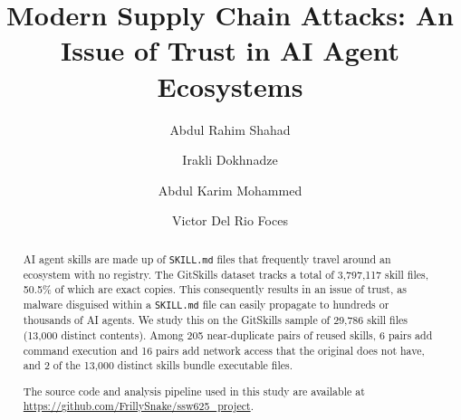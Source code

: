 \documentclass[sigconf,review]{acmart}
\begin{document}
\title{Modern Supply Chain Attacks: An Issue of Trust in AI Agent Ecosystems}


\author{Abdul Rahim Shahad}

\author{Irakli Dokhnadze}
  
\author{Abdul Karim Mohammed}
  
\author{Victor Del Rio Foces}
  




\begin{abstract}
AI agent skills are made up of \texttt{SKILL.md} files that frequently travel around an ecosystem with no registry. The GitSkills dataset tracks a total of 3,797,117 skill files, 50.5\% of which are exact copies. This consequently results in an issue of trust, as malware disguised within a \texttt{SKILL.md} file can easily propagate to hundreds or thousands of AI agents. We study this on the GitSkills sample of 29,786 skill files (13,000 distinct contents). Among 205 near-duplicate pairs of reused skills, 6 pairs add command execution and 16 pairs add network access that the original does not have, and 2 of the 13,000 distinct skills bundle executable files.

The source code and analysis pipeline used in this study are available at \url{https://github.com/FrillySnake/ssw625_project}.
\end{abstract}
\end{document}
